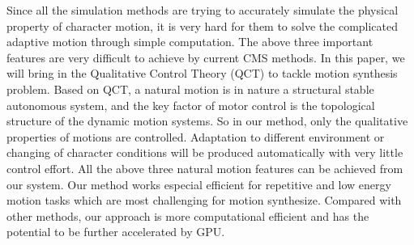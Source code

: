 Since all the simulation methods are trying to accurately simulate the physical property of character motion, it is very hard for them to solve the complicated adaptive motion through simple computation. The above three important features are very difficult to achieve by current CMS methods.
In this paper, we will bring in the Qualitative Control Theory (QCT) to tackle motion synthesis problem. Based on QCT, a natural motion is in nature a structural stable autonomous system, and the key factor of motor control is the topological structure of the dynamic motion systems. So in our method, only the qualitative properties of motions are controlled. Adaptation to different environment or changing of character conditions will be produced automatically with very little control effort. All the above three natural motion features can be achieved from our system. Our method works especial efficient for repetitive and low energy motion tasks which are most challenging for motion synthesize. Compared with other methods, our approach is more computational efficient and has the potential to be further accelerated by GPU.
